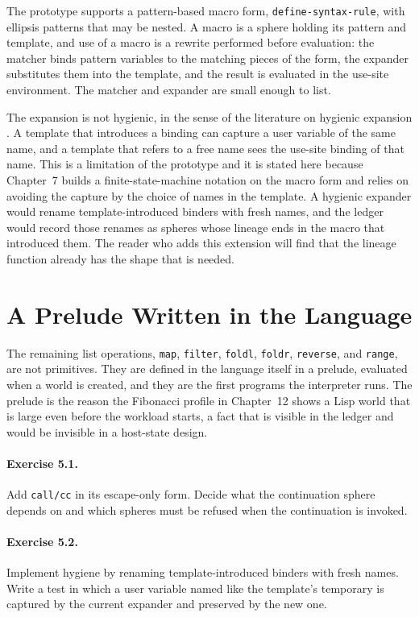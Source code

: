 The prototype supports a pattern-based macro form, \texttt{define-syntax-rule}, with ellipsis patterns that may be nested. A macro is a sphere holding its pattern and template, and use of a macro is a rewrite performed before evaluation: the matcher binds pattern variables to the matching pieces of the form, the expander substitutes them into the template, and the result is evaluated in the use-site environment. The matcher and expander are small enough to list.


The expansion is not hygienic, in the sense of the literature on hygienic expansion \cite{kohlbecker86}. A template that introduces a binding can capture a user variable of the same name, and a template that refers to a free name sees the use-site binding of that name. This is a limitation of the prototype and it is stated here because Chapter~7 builds a finite-state-machine notation on the macro form and relies on avoiding the capture by the choice of names in the template. A hygienic expander would rename template-introduced binders with fresh names, and the ledger would record those renames as spheres whose lineage ends in the macro that introduced them. The reader who adds this extension will find that the lineage function already has the shape that is needed.

\section{A Prelude Written in the Language}

The remaining list operations, \texttt{map}, \texttt{filter}, \texttt{foldl}, \texttt{foldr}, \texttt{reverse}, and \texttt{range}, are not primitives. They are defined in the language itself in a prelude, evaluated when a world is created, and they are the first programs the interpreter runs. The prelude is the reason the Fibonacci profile in Chapter~12 shows a Lisp world that is large even before the workload starts, a fact that is visible in the ledger and would be invisible in a host-state design.

\paragraph{Exercise 5.1.} Add \texttt{call/cc} in its escape-only form. Decide what the continuation sphere depends on and which spheres must be refused when the continuation is invoked.

\paragraph{Exercise 5.2.} Implement hygiene by renaming template-introduced binders with fresh names. Write a test in which a user variable named like the template's temporary is captured by the current expander and preserved by the new one.

